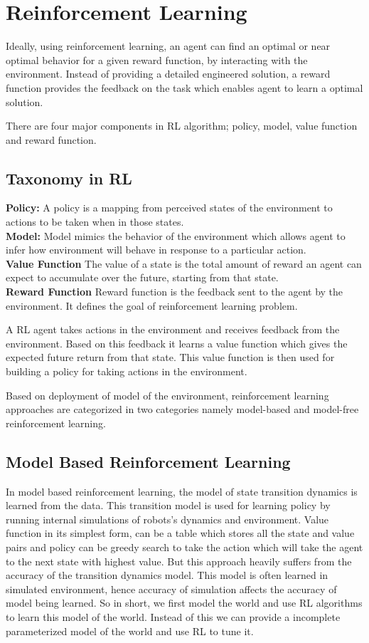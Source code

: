 \documentclass[thesis]{mas_proposal}
\begin{document}
\section{Reinforcement Learning}

Ideally, using reinforcement learning, an agent can find an optimal or near optimal behavior for a given reward function, by interacting with the environment. Instead of providing a detailed engineered solution, a reward function provides the feedback on the task which enables agent to learn a optimal solution.  

There are four major components in RL algorithm; policy, model, value function and reward function.

\subsection{Taxonomy in RL}

\textbf{Policy:}
A policy is a mapping from perceived states of the environment to actions to be taken when in those states. \\
\textbf{Model:}
Model mimics the behavior of the environment which allows agent to infer how environment will behave in response to a particular action. \\
\textbf{Value Function}
The value of a state is the total amount of reward an agent can expect to accumulate over the future, starting from that state. \\
\textbf{Reward Function}
Reward function is the feedback sent to the agent by the environment. It defines the goal of reinforcement learning problem.

A RL agent takes actions in the environment and receives feedback from the environment. Based on this feedback it learns a value function which gives the expected future return from that state. This value function is then used for building a policy for taking actions in the environment. 

Based on deployment of model of the environment, reinforcement learning approaches are categorized in two categories namely model-based and model-free reinforcement learning.


\subsection{Model Based Reinforcement Learning} \label{mod-RL}
In model based  reinforcement learning, the model of state transition dynamics is learned from the data. This transition model is used for learning policy by running internal simulations of robots's dynamics and environment. Value function in its simplest form, can be a table which stores all the state and value pairs and policy can be greedy search to take the action which will take the agent to the next state with highest value. But this approach heavily suffers from the accuracy of the transition dynamics model. This model is often learned in simulated environment, hence accuracy of simulation affects the accuracy of model being learned. So in short, we first model the world and use RL algorithms to learn this model of the world. Instead of this we can provide a incomplete parameterized model of the world and use RL to tune it.  
\end{document}
